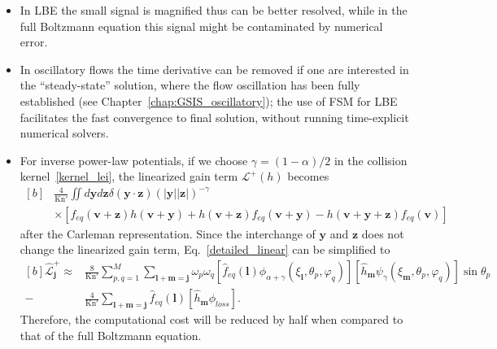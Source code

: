 \begin{itemize}
	\item In LBE the small signal is magnified thus can be better resolved, while in the full Boltzmann equation this signal might be contaminated by numerical error.
	
	\item In oscillatory flows the time derivative can be removed if one are interested in the ``steady-state'' solution, where the flow oscillation has been fully established (see Chapter~\ref{chap:GSIS_oscillatory}); the use of FSM for LBE facilitates the fast convergence to final solution, without running time-explicit numerical solvers. 
	
	\item For inverse power-law potentials, if we choose $\gamma=(1-\alpha)/2$ in the collision kernel~\eqref{kernel_lei}, the linearized gain term $\mathcal{L}^+(h)$ becomes
	\begin{equation}
	\begin{aligned}[b]
	&\frac{4}{\text{Kn}'}\iint{d\bm{y} d\bm{z}}\delta(\bm{y}\cdot{}\bm{z})(|\bm{y}||\bm{z}|)^{-\gamma}\\ &\times[f_{eq}(\bm{v}+\bm{z})h(\bm{v}+\bm{y})+h(\bm{v}+\bm{z})f_{eq}(\bm{v}+\bm{y})
	-h(\bm{v}+\bm{y}+\bm{z})f_{eq}(\bm{v})]
	\end{aligned}
	\end{equation}
	after the Carleman representation. Since the interchange of $\bm{y}$ and $\bm{z}$ does not change the linearized gain term, Eq.~\eqref{detailed_linear} can be simplified to 
	\begin{equation}\label{detailed_linear_half}
	\begin{aligned}[b]
	\widehat{\mathcal{L}}^+_{\bm{j}}\approx &\frac{8}{\text{Kn}'}\sum_{p,q=1}^{M} \sum_{\bm{l}+\bm{m}=\bm{j} }\omega_p\omega_q[\hat{f}_{eq}(\bm{l}){\phi_{\alpha+\gamma}(\xi_{\bm{l}},\theta_p,\varphi_q)}][\hat{h}_{\bm{m}}{\psi_{\gamma}(\xi_{\bm{m}},\theta_p,\varphi_q)}]\sin\theta_p\\
	-&\frac{4}{\text{Kn}'}\sum_{\bm{l}+\bm{m}=\bm{j} }\hat{f}_{eq}(\bm{l})[\hat{h}_{\bm{m}}{\phi_{loss}}]. 
	\end{aligned}
	\end{equation}
	Therefore, the computational cost will be reduced by half when compared to that of the full Boltzmann equation. 
	
\end{itemize}


